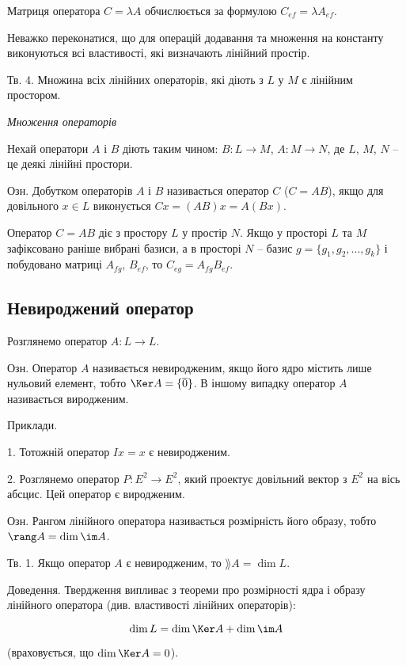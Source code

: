 Матриця оператора $C = \lambda A$ обчислюється за формулою $C_{ef} = \lambda A_{ef}$.

Неважко переконатися, що для операцій додавання та множення на константу
виконуються всі властивості, які визначають лінійний простір.


Тв. 4. Множина всіх лінійних операторів, які діють з $L$ у $M$ є лінійним
простором.


\textit{Множення операторів}


Нехай оператори $A$ і $B$ діють таким чином: $B: L \rightarrow M$, $A: M \rightarrow N$, де
$L$, $M$, $N$ -- це деякі лінійні простори.


Озн. Добутком операторів $A$ і $B$ називається оператор $C$ ($C = A B$), якщо
для довільного $x \in L$ виконується $C x = (AB)x = A(B x)$.


Оператор $C = A B$ діє з простору $L$ у простір $N$. Якщо у просторі $L$ та $M$
зафіксовано раніше вибрані базиси, а в просторі $N$ – базис $g = \{g_1, g_2, ..., g_k\}$ і
побудовано матриці $A_{fg}$, $B_{ef}$, то $C_{eg} = A_{fg} B_{ef}$. 

\subsection{Невироджений оператор}

Розглянемо оператор $A: L \rightarrow L$. 


Озн. Оператор $A$ називається невиродженим, якщо його ядро містить лише
нульовий елемент, тобто $\Ker A = \{\overline{0}\}$. В іншому випадку оператор $A$ називається
виродженим.


Приклади.

1. Тотожній оператор $I x = x$ є невиродженим.

2. Розглянемо оператор $P: E^2 \rightarrow E^2$, який проектує довільний вектор з $E^2$ на
вісь абсцис. Цей оператор є виродженим.


Озн. Рангом лінійного оператора називається розмірність його образу, тобто
$\rang A = \dim \im A$.


Тв. 1. Якщо оператор $A$ є невиродженим, то $\rang A = \dim L$.

Доведення. Твердження випливає з теореми про розмірності ядра і образу
лінійного оператора (див. властивості лінійних операторів):

$$\dim L = \dim \Ker A + \dim \im A$$

(враховується, що $\dim \Ker A = 0$).



